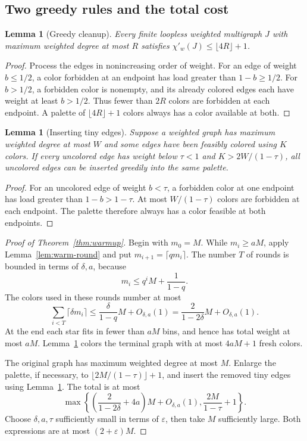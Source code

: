 \documentclass[11pt]{article}
\newtheorem{lemma}[theorem]{Lemma}
\theoremstyle{definition}\newtheorem{algorithm}{Algorithm}[section]
\numberwithin{equation}{section}
\theoremstyle{remark}\newtheorem*{remark}{Remark}
\begin{document}
\subsection{Two greedy rules and the total cost}
\begin{lemma}[Greedy cleanup]\label{lem:general-cleanup}
Every finite loopless weighted multigraph $J$ with maximum weighted
degree at most $R$ satisfies $\chi'_w(J)\le\lfloor4R\rfloor+1$.
\end{lemma}
\begin{proof}
Process the edges in nonincreasing order of weight. For an edge of
weight $b\le1/2$, a color forbidden at an endpoint has load greater
than $1-b\ge1/2$. For $b>1/2$, a forbidden color is nonempty, and
its already colored edges each have weight at least $b>1/2$.
Thus fewer than $2R$ colors are forbidden at each endpoint. A palette
of $\lfloor4R\rfloor+1$ colors always has a color available at both.
\end{proof}

\begin{lemma}[Inserting tiny edges]\label{lem:greedy}
Suppose a weighted graph has maximum weighted degree at most $W$ and
some edges have been feasibly colored using $K$ colors. If every
uncolored edge has weight below $\tau<1$ and $K>2W/(1-\tau)$, all
uncolored edges can be inserted greedily into the same palette.
\end{lemma}
\begin{proof}
For an uncolored edge of weight $b<\tau$, a forbidden color at one
endpoint has load greater than $1-b>1-\tau$. At most $W/(1-\tau)$
colors are forbidden at each endpoint. The palette therefore always
has a color feasible at both endpoints.
\end{proof}

\begin{proof}[Proof of Theorem~\ref{thm:warmup}]
Begin with $m_0=M$. While $m_i\ge aM$, apply
Lemma~\ref{lem:warm-round} and put $m_{i+1}=\lceil qm_i\rceil$.
The number $T$ of rounds is bounded in terms of $\delta,a$, because
\[
 m_i\le q^iM+\frac1{1-q}.
\]
The colors used in these rounds number at most
\[
 \sum_{i<T}\lceil\delta m_i\rceil
 \le\frac{\delta}{1-q}M+O_{\delta,a}(1)
 =\frac2{1-2\delta}M+O_{\delta,a}(1).
\]
At the end each star fits in fewer than $aM$ bins, and hence has total
weight at most $aM$. Lemma~\ref{lem:general-cleanup} colors the terminal
graph with at most $4aM+1$ fresh colors.

The original graph has maximum weighted degree at most $M$. Enlarge the
palette, if necessary, to $\lfloor2M/(1-\tau)\rfloor+1$, and insert
the removed tiny edges using Lemma~\ref{lem:greedy}. The total is
at most
\[
 \max\left\{\left(\frac2{1-2\delta}+4a\right)M+O_{\delta,a}(1),
                  \frac{2M}{1-\tau}+1\right\}.
\]
Choose $\delta,a,\tau$ sufficiently small in terms of $\varepsilon$,
then take $M$ sufficiently large. Both expressions are at most
$(2+\varepsilon)M$.
\end{proof}
\end{document}
